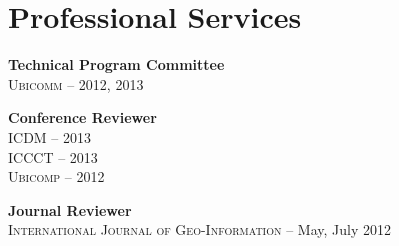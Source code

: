 \section{\sc Professional Services}
{\bf Technical Program Committee}\\
\textsc{Ubicomm} -- 2012, 2013

{\bf Conference Reviewer}\\
\textsc{ICDM} -- 2013\\
\textsc{ICCCT} -- 2013\\
\textsc{Ubicomp} -- 2012

{\bf Journal Reviewer}\\
\textsc{International Journal of Geo-Information} -- May, July 2012
